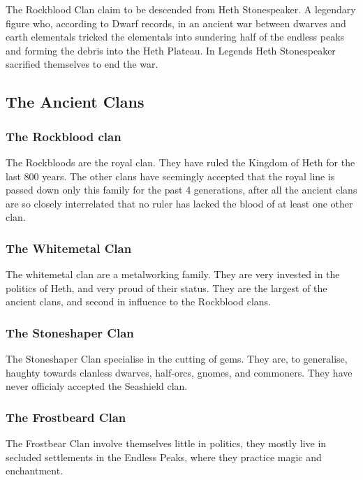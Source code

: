 \documentclass[10pt,twoside,twocolumn,openany,justified,bg=full,nomultitoc]{dndbook}
\begin{document}
The Rockblood Clan claim to be descended from Heth Stonespeaker. A legendary figure who, according to Dwarf records, in an ancient war between dwarves and earth elementals tricked the elementals into sundering half of the endless peaks and forming the debris into the Heth Plateau. In Legends Heth Stonespeaker sacrified themselves to end the war. 

\subsection{The Ancient Clans}
\label{sec-2-2-1}
\subsubsection{The Rockblood clan}
\label{sec-2-2-1-1}

The Rockbloods are the royal clan. They have ruled the Kingdom of Heth for the last 800 years. The other clans have seemingly accepted that the royal line is passed down only this family for the past 4 generations, after all the ancient clans are so closely interrelated that no ruler has lacked the blood of at least one other clan.
\subsubsection{The Whitemetal Clan}
\label{sec-2-2-1-2}
The whitemetal clan are a metalworking family. They are very invested in the politics of Heth, and very proud of their status. They are the largest of the ancient clans, and second in influence to the Rockblood clans.

\subsubsection{The Stoneshaper Clan}
\label{sec-2-2-1-3}
The Stoneshaper Clan specialise in the cutting of gems. They are, to generalise, haughty towards clanless dwarves, half-orcs, gnomes, and commoners. They have never officialy accepted the Seashield clan.

\subsubsection{The Frostbeard Clan}
\label{sec-2-2-1-4}
The Frostbear Clan involve themselves little in politics, they mostly live in secluded settlements in the Endless Peaks, where they practice magic and enchantment.
\end{document}
